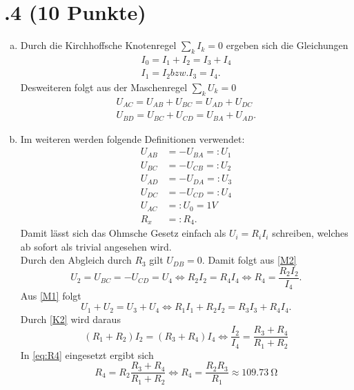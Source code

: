\section*{\nr.4 \titfour (10 Punkte)}
\begin{enumerate}[(a)]
\item Durch die Kirchhoffsche Knotenregel $\sum_{k} I_{k} = 0$ ergeben sich die Gleichungen
\begin{align}
	I_{0} = I_1 + I_2 = I_3 + I_4 \label{K1} \\
	I_1 = I_2 bzw. I_3 = I_4 \label{K2}.
\end{align}
Desweiteren folgt aus der Maschenregel $\sum_{k} U_k = 0$ 
\begin{align}
	U_{AC} = U_{AB} + U_{BC} = U_{AD} + U_{DC} \label{M1} \\
	U_{BD} = U_{BC} + U_{CD} = U_{BA} + U_{AD} \label{M2}.
\end{align}
\item Im weiteren werden folgende Definitionen verwendet:
\begin{align}
	U_{AB} &= -U_{BA} =: U_1 \\
	U_{BC} &= -U_{CB} =: U_2 \\
	U_{AD} &= -U_{DA} =: U_3 \\
	U_{DC} &= -U_{CD} =: U_4 \\
	U_{AC} &=: U_0 = 1V	 \\
	R_x &=: R_4.
\end{align}
Damit lässt sich das Ohmsche Gesetz einfach als $U_i = R_i I_i$ schreiben, welches ab sofort als trivial angesehen wird. \\
Durch den Abgleich durch $R_3$ gilt $U_{DB} = 0$. Damit folgt aus \ref{M2}
\begin{equation}
	U_2 = U_{BC} = -U_{CD} = U_4 \Leftrightarrow R_2 I_2 = R_4 I_4 \Leftrightarrow R_4 = \frac{R_2 I_2}{I_4}. \label{eq:R4}
\end{equation}
Aus \ref{M1} folgt
\begin{equation}
	U_1 + U_2 = U_3 +  U_4 \Leftrightarrow R_1 I_1 + R_2 I_2 = R_3 I_3 + R_4 I_4.
\end{equation}
Durch \ref{K2} wird daraus
\begin{equation}
	(R_1 + R_2)I_2 = (R_3 + R_4)I_4 \Leftrightarrow \frac{I_2}{I_4} = \frac{R_3 + R_4}{R_1 + R_2} \label{eq:I4}
\end{equation}
In \ref{eq:R4} eingesetzt ergibt sich
\begin{equation}
	R_4 = R_2 \frac{R_3 + R_4}{R_1 + R_2} \Leftrightarrow R_4 = \frac{R_2 R_3}{R_1} \approx \SI{109.73}{\ohm}

\end{equation}
\end{enumerate}
